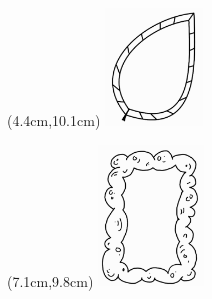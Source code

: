 \begin{textblock*}{6cm}(4.4cm,10.1cm) %
  \includegraphics[width=2.6cm]{./bilder/ramar/Ram9.png} %
\end{textblock*}

\begin{textblock*}{6cm}(7.1cm,9.8cm) %
  \includegraphics[width=2.8cm]{./bilder/ramar/Ram10.png} %
\end{textblock*}

\newpage


